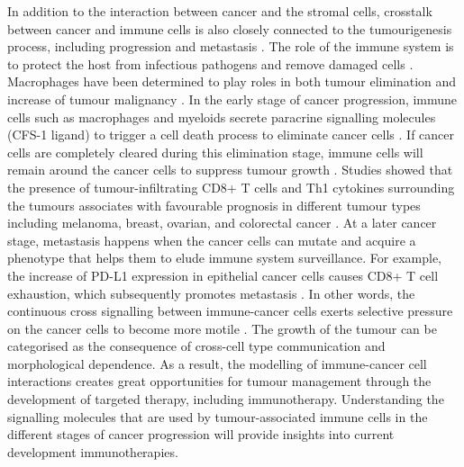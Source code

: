 In addition to the interaction between cancer and the stromal cells, crosstalk between cancer and immune cells is also closely connected to the tumourigenesis process, including progression and metastasis \cite{wang2017role}. The role of the immune system is to protect the host from infectious pathogens and remove damaged cells \cite{davis2007molecular}. Macrophages have been determined to play roles in both tumour elimination and increase of tumour malignancy \cite{wyckoff2007direct, chung2005molecular}. In the early stage of cancer progression, immune cells such as macrophages and myeloids secrete paracrine signalling molecules (\ie CFS-1 ligand)  to trigger a cell death process to eliminate cancer cells \cite{wyckoff2007direct}. If cancer cells are completely cleared during this elimination stage, immune cells will remain around the cancer cells to suppress tumour growth \cite{bronkhorst2011detection, ly2010aged}. Studies showed that the presence of tumour-infiltrating CD8+ T cells and Th1 cytokines surrounding the tumours associates with favourable prognosis in different tumour types including melanoma, breast, ovarian, and colorectal cancer \cite{fridman2012immune, shalapour2015immunity}. At a later cancer stage, metastasis happens when the cancer cells can mutate and acquire a phenotype that helps them to elude immune system surveillance. For example, the increase of PD-L1 expression in epithelial cancer cells causes CD8+ T cell exhaustion, which subsequently promotes metastasis \cite{chen2014metastasis, wei2019combination}. In other words, the continuous cross signalling between immune-cancer cells exerts selective pressure on the cancer cells to become more motile \cite{giampieri2009localized,ilina2009mechanisms}. The growth of the tumour can be categorised as the consequence of cross-cell type communication and morphological dependence. As a result, the modelling of immune-cancer cell interactions creates great opportunities for tumour management through the development of targeted therapy, including immunotherapy. Understanding the signalling molecules that are used by tumour-associated immune cells in the different stages of cancer progression will provide insights into current development immunotherapies.  

